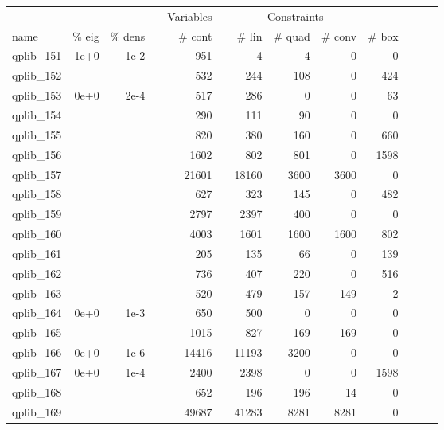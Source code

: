 \begin{table}
 \centering
 \setlength{\tabcolsep}{11pt}
 \renewcommand \arraystretch{1}
\begin{tabular}{lrrrrrrrrrrrr}
\toprule

		&		&		&	&	\multicolumn{1}{c}{Variables}	&	&	\multicolumn{3}{c}{Constraints}							\\
\cmidrule(lr){5-5} \cmidrule(lr){7-10}																	
name	&	\% eig	&	\% dens	&	&	\# cont 	&	&	\# lin 	&	\# quad 	&	\# conv 	&	\# box	\\
\cmidrule(lr){5-5} \cmidrule(lr){7-10}																	

qplib\_151	&	1e+0	&	1e-2	&	&	951	&	&	4	&	4	&	0	&	0	\\
qplib\_152	&		&		&	&	532	&	&	244	&	108	&	0	&	424	\\
qplib\_153	&	0e+0	&	2e-4	&	&	517	&	&	286	&	0	&	0	&	63	\\
qplib\_154	&		&		&	&	290	&	&	111	&	90	&	0	&	0	\\
qplib\_155	&		&		&	&	820	&	&	380	&	160	&	0	&	660	\\
qplib\_156	&		&		&	&	1602	&	&	802	&	801	&	0	&	1598	\\
qplib\_157	&		&		&	&	21601	&	&	18160	&	3600	&	3600	&	0	\\
qplib\_158	&		&		&	&	627	&	&	323	&	145	&	0	&	482	\\
qplib\_159	&		&		&	&	2797	&	&	2397	&	400	&	0	&	0	\\
qplib\_160	&		&		&	&	4003	&	&	1601	&	1600	&	1600	&	802	\\
qplib\_161	&		&		&	&	205	&	&	135	&	66	&	0	&	139	\\
qplib\_162	&		&		&	&	736	&	&	407	&	220	&	0	&	516	\\
qplib\_163	&		&		&	&	520	&	&	479	&	157	&	149	&	2	\\
qplib\_164	&	0e+0	&	1e-3	&	&	650	&	&	500	&	0	&	0	&	0	\\
qplib\_165	&		&		&	&	1015	&	&	827	&	169	&	169	&	0	\\
qplib\_166	&	0e+0	&	1e-6	&	&	14416	&	&	11193	&	3200	&	0	&	0	\\
qplib\_167	&	0e+0	&	1e-4	&	&	2400	&	&	2398	&	0	&	0	&	1598	\\
qplib\_168	&		&		&	&	652	&	&	196	&	196	&	14	&	0	\\
qplib\_169	&		&		&	&	49687	&	&	41283	&	8281	&	8281	&	0	\\

\end{tabular}
\end{table}
